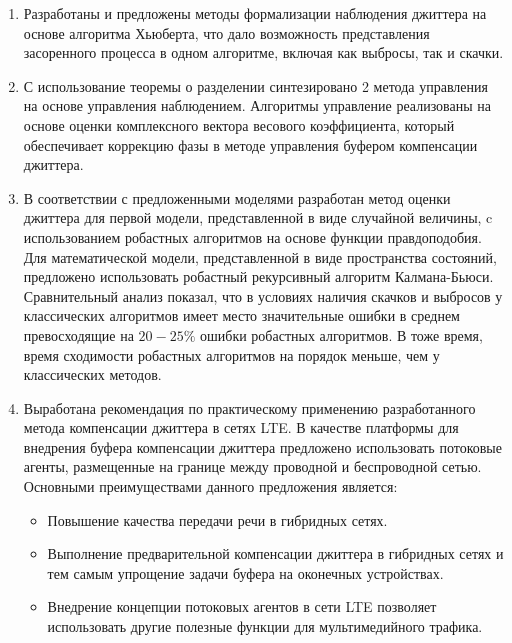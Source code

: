 \begin{enumerate}
 \item Разработаны и предложены методы формализации наблюдения джиттера
 на основе алгоритма Хьюберта, что дало возможность представления засоренного процесса в одном алгоритме, включая как выбросы, так и скачки.
 
 \item С использование теоремы о разделении синтезировано 2 метода управления на основе управления наблюдением.
 Алгоритмы управление реализованы на основе оценки комплексного вектора весового коэффициента, который обеспечивает коррекцию фазы в методе управления буфером компенсации джиттера.
 

 
 \item В соответствии с предложенными моделями разработан метод оценки джиттера для первой модели, представленной в виде случайной величины, 
 c использованием робастных алгоритмов на основе функции правдоподобия.
 Для математической модели, представленной в виде пространства состояний, предложено использовать робастный рекурсивный алгоритм Калмана-Бьюси.
 Сравнительный анализ показал, что в условиях наличия скачков и выбросов у классических алгоритмов имеет место значительные ошибки в среднем превосходящие на $20-25\%$ ошибки робастных алгоритмов.
 В тоже время, время сходимости робастных алгоритмов на порядок меньше, чем у классических методов.
 
 \item Выработана рекомендация по практическому применению разработанного метода компенсации джиттера в сетях LTE.
 В качестве платформы для внедрения буфера компенсации джиттера предложено использовать потоковые агенты, размещенные на границе между проводной и беспроводной сетью.
 Основными преимуществами данного предложения является:
 \begin{itemize}
  \item Повышение качества передачи речи в гибридных сетях.
  \item Выполнение предварительной компенсации джиттера в гибридных сетях и тем самым упрощение задачи буфера на оконечных устройствах.
  \item Внедрение концепции потоковых агентов в сети LTE позволяет использовать другие полезные функции для мультимедийного трафика.
 \end{itemize}
 
\end{enumerate}
